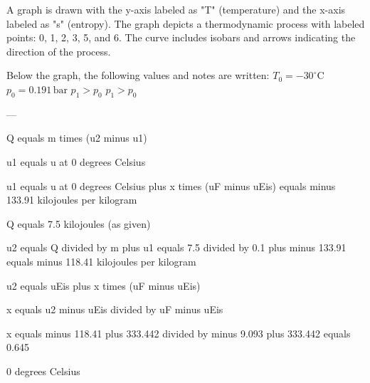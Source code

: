 A graph is drawn with the y-axis labeled as "T" (temperature) and the x-axis labeled as "s" (entropy). The graph depicts a thermodynamic process with labeled points: 0, 1, 2, 3, 5, and 6. The curve includes isobars and arrows indicating the direction of the process.  

Below the graph, the following values and notes are written:  
\( T_0 = -30^\circ \text{C} \)  
\( p_0 = 0.191 \, \text{bar} \)  
\( p_1 > p_0 \)  
\( p_1 > p_0 \)  

---

Q equals m times (u2 minus u1)  

u1 equals u at 0 degrees Celsius  

u1 equals u at 0 degrees Celsius plus x times (uF minus uEis) equals minus 133.91 kilojoules per kilogram  

Q equals 7.5 kilojoules (as given)  

u2 equals Q divided by m plus u1 equals 7.5 divided by 0.1 plus minus 133.91 equals minus 118.41 kilojoules per kilogram  

u2 equals uEis plus x times (uF minus uEis)  

x equals u2 minus uEis divided by uF minus uEis  

x equals minus 118.41 plus 333.442 divided by minus 9.093 plus 333.442 equals 0.645  

0 degrees Celsius
